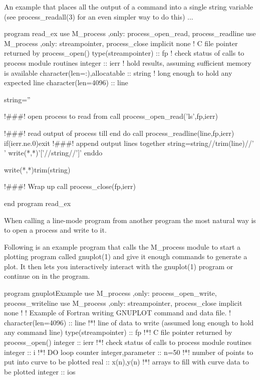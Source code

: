 \begin{DoxyVerb}An example that places all the output of a command into a single
string variable (see process_readall(3) for an even simpler way to
do this) ...

  program read_ex
   use M_process ,only: process_open_read, process_readline
   use M_process ,only: streampointer, process_close
   implicit none
   ! C file pointer returned by process_open()
   type(streampointer) :: fp
   ! check status of calls to process module routines
   integer :: ierr
   ! hold results, assuming sufficient memory is available
   character(len=:),allocatable :: string
   ! long enough to hold any expected line
   character(len=4096) :: line

      string=''

      !###! open process to read from
      call process_open_read('ls',fp,ierr)

      !###! read output of process till end
      do
         call process_readline(line,fp,ierr)
         if(ierr.ne.0)exit
         !###! append output lines together
         string=string//trim(line)//' '
         write(*,*)'['//string//']'
      enddo

      write(*,*)trim(string)

      !###! Wrap up
      call process_close(fp,ierr)

  end program read_ex

When calling a line-mode program from another program the most natural
way is to open a process and write to it.

Following is an example program that calls the M_process module to
start a plotting program called gnuplot(1) and give it enough commands
to generate a plot. It then lets you interactively interact with the
gnuplot(1) program or continue on in the program.

 program gnuplotExample
  use M_process ,only: process_open_write, process_writeline
  use M_process ,only: streampointer, process_close
  implicit none
  !
  ! Example of Fortran writing GNUPLOT command and data file.
  !
  character(len=4096) :: line                     !*! line of data to write (assumed long enough to hold any command line)
  type(streampointer) :: fp                       !*! C file pointer returned by process_open()
  integer :: ierr                                 !*! check status of calls to process module routines
  integer :: i                                    !*! DO loop counter
  integer,parameter   :: n=50                     !*! number of points to put into curve to be plotted
  real                :: x(n),y(n)                !*! arrays to fill with curve data to be plotted
  integer             :: ios


\end{DoxyVerb}
